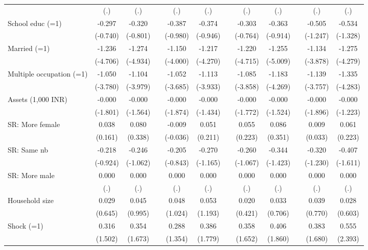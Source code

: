 {\begin{longtable}{@{\extracolsep{\fill}}lccccccccccc}
      & (.) & (.) &   & (.) & (.) &   & (.) & (.) &   & (.) & (.) \\
    School educ (=1) & -0.297 & -0.320 &   & -0.387 & -0.374 &   & -0.303 & -0.363 &   & -0.505 & -0.534 \\
      & (-0.740) & (-0.801) &   & (-0.980) & (-0.946) &   & (-0.764) & (-0.914) &   & (-1.247) & (-1.328) \\
    Married (=1) & -1.236 & -1.274 &   & -1.150 & -1.217 &   & -1.220 & -1.255 &   & -1.134 & -1.275 \\
      & (-4.706) & (-4.934) &   & (-4.000) & (-4.270) &   & (-4.715) & (-5.009) &   & (-3.878) & (-4.279) \\
    Multiple occupation (=1) & -1.050 & -1.104 &   & -1.052 & -1.113 &   & -1.085 & -1.183 &   & -1.139 & -1.335 \\
      & (-3.780) & (-3.979) &   & (-3.685) & (-3.933) &   & (-3.858) & (-4.269) &   & (-3.757) & (-4.283) \\
    Assets (1,000 INR) & -0.000 & -0.000 &   & -0.000 & -0.000 &   & -0.000 & -0.000 &   & -0.000 & -0.000 \\
      & (-1.801) & (-1.564) &   & (-1.874) & (-1.434) &   & (-1.772) & (-1.524) &   & (-1.896) & (-1.223) \\
    SR: More female & 0.038 & 0.080 &   & -0.009 & 0.051 &   & 0.055 & 0.086 &   & 0.009 & 0.061 \\
      & (0.161) & (0.338) &   & (-0.036) & (0.211) &   & (0.223) & (0.351) &   & (0.033) & (0.223) \\
    SR: Same nb & -0.218 & -0.246 &   & -0.205 & -0.270 &   & -0.260 & -0.344 &   & -0.320 & -0.407 \\
      & (-0.924) & (-1.062) &   & (-0.843) & (-1.165) &   & (-1.067) & (-1.423) &   & (-1.230) & (-1.611) \\
    SR: More male & 0.000 & 0.000 &   & 0.000 & 0.000 &   & 0.000 & 0.000 &   & 0.000 & 0.000 \\
      & (.) & (.) &   & (.) & (.) &   & (.) & (.) &   & (.) & (.) \\
    Household size & 0.029 & 0.045 &   & 0.048 & 0.053 &   & 0.020 & 0.033 &   & 0.039 & 0.028 \\
      & (0.645) & (0.995) &   & (1.024) & (1.193) &   & (0.421) & (0.706) &   & (0.770) & (0.603) \\
    Shock (=1) & 0.316 & 0.354 &   & 0.288 & 0.386 &   & 0.358 & 0.406 &   & 0.383 & 0.555 \\
      & (1.502) & (1.673) &   & (1.354) & (1.779) &   & (1.652) & (1.860) &   & (1.680) & (2.393) \\

\end{longtable}}
